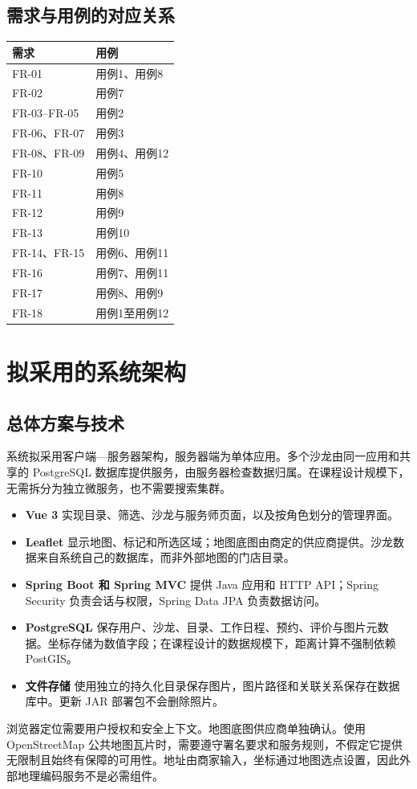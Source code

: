 \subsection{需求与用例的对应关系}
\begin{center}
\begin{tabular}{ll}
\toprule 需求 & 用例 \\ \midrule
FR-01 & 用例1、用例8 \\
FR-02 & 用例7 \\
FR-03--FR-05 & 用例2 \\
FR-06、FR-07 & 用例3 \\
FR-08、FR-09 & 用例4、用例12 \\
FR-10 & 用例5 \\
FR-11 & 用例8 \\
FR-12 & 用例9 \\
FR-13 & 用例10 \\
FR-14、FR-15 & 用例6、用例11 \\
FR-16 & 用例7、用例11 \\
FR-17 & 用例8、用例9 \\
FR-18 & 用例1至用例12 \\
\bottomrule
\end{tabular}
\end{center}

\section{拟采用的系统架构}
\subsection{总体方案与技术}
系统拟采用客户端—服务器架构，服务器端为单体应用。多个沙龙由同一应用和共享的 PostgreSQL 数据库提供服务，由服务器检查数据归属。在课程设计规模下，无需拆分为独立微服务，也不需要搜索集群。
\begin{itemize}
\item \textbf{Vue 3} 实现目录、筛选、沙龙与服务师页面，以及按角色划分的管理界面。
\item \textbf{Leaflet} 显示地图、标记和所选区域；地图底图由商定的供应商提供。沙龙数据来自系统自己的数据库，而非外部地图的门店目录。
\item \textbf{Spring Boot 和 Spring MVC} 提供 Java 应用和 HTTP API；Spring Security 负责会话与权限，Spring Data JPA 负责数据访问。
\item \textbf{PostgreSQL} 保存用户、沙龙、目录、工作日程、预约、评价与图片元数据。坐标存储为数值字段；在课程设计的数据规模下，距离计算不强制依赖 PostGIS。
\item \textbf{文件存储} 使用独立的持久化目录保存图片，图片路径和关联关系保存在数据库中。更新 JAR 部署包不会删除照片。
\end{itemize}
浏览器定位需要用户授权和安全上下文。地图底图供应商单独确认。使用 OpenStreetMap 公共地图瓦片时，需要遵守署名要求和服务规则，不假定它提供无限制且始终有保障的可用性。地址由商家输入，坐标通过地图选点设置，因此外部地理编码服务不是必需组件。

